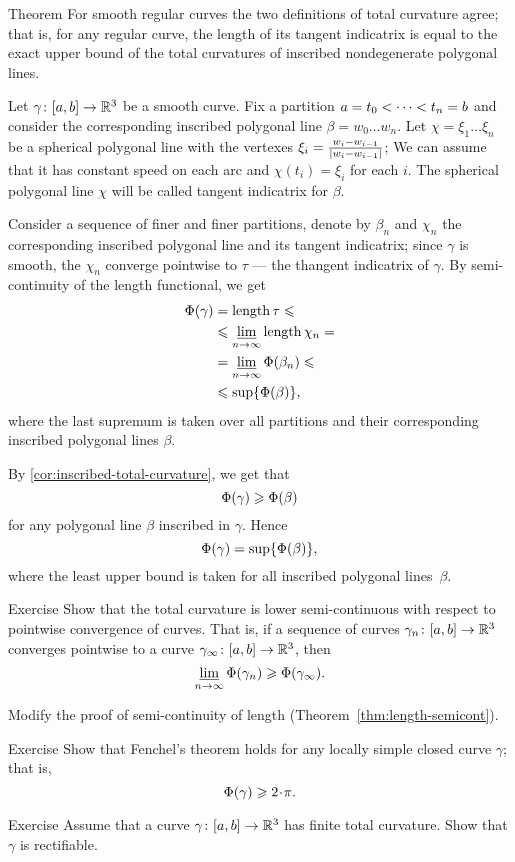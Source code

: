\begin{thm}{Theorem}\label{thm:total-curvature=}
For smooth regular curves the two definitions of total curvature agree;
that is, for any regular curve, the length of its tangent indicatrix is equal to the exact upper bound of the total curvatures of inscribed nondegenerate polygonal lines.
\end{thm}

Let $\gamma\colon[a,b]\to\mathbb{R}^3$ be a smooth curve.
Fix a partition $a\z=t_0<\dots<t_n=b$ and consider the corresponding inscribed polygonal line $\beta=w_0\dots w_n$.
Let $\chi=\xi_1\dots\xi_n$ be a spherical polygonal line
with the vertexes $\xi_i\z=\tfrac{w_i-w_{i-1}}{|w_i-w_{i-1}|}$;
We can assume that it has constant speed on each arc and $\chi(t_i)=\xi_i$ for each $i$. 
The spherical polygonal line $\chi$ will be called tangent indicatrix for $\beta$.

Consider a sequence of finer and finer partitions, denote by $\beta_n$ and $\chi_n$ the corresponding inscribed polygonal line and its tangent indicatrix;
since $\gamma$ is smooth, the $\chi_n$ converge pointwise to $\tau$ --- the thangent indicatrix of $\gamma$.
By semi-continuity of the length functional, we get  
\begin{align*}
\Phi({\gamma})&=\mathop{\rm length}\nolimits \tau\leqslant  
\\
&\leqslant \varliminf_{n\to\infty}\mathop{\rm length}\nolimits \chi_n=
\\
&= \varliminf_{n\to\infty}\Phi({\beta_n})\leqslant
\\
&\leqslant \sup\{\Phi({\beta})\},
\end{align*}
where the last supremum is taken over all partitions and their corresponding inscribed polygonal lines $\beta$.

By \ref{cor:inscribed-total-curvature}, we get that
\[\Phi({\gamma})\geqslant \Phi({\beta})\]
for any polygonal line $\beta$ inscribed in $\gamma$.
Hence 
\[\Phi({\gamma})=\sup\{\Phi({\beta})\},\]
where the least upper bound is taken for all inscribed polygonal lines~$\beta$.
\qeds


\begin{thm}{Exercise}
Show that the total curvature is lower semi-continuous with respect to pointwise convergence of curves.
That is, if a sequence
of curves $\gamma_n\colon[a,b]\to \mathbb{R}^3$ converges pointwise 
to a curve $\gamma_\infty\:[a,b]\z\to \RR^3$, then 
\[\varliminf_{n\to\infty} \Phi({\gamma_n}) \geqslant \Phi({\gamma_\infty}).\]
\end{thm}

 Modify the proof of semi-continuity of length (Theorem~\ref{thm:length-semicont}).

\begin{thm}{Exercise}
Show that Fenchel's theorem holds for any locally simple closed curve $\gamma$;
that is, 
\[\tc\gamma\ge2\cdot\pi.\]
\end{thm}

\begin{thm}{Exercise} 
Assume that a curve $\gamma\colon[a,b]\to\mathbb{R}^3$ has finite total curvature.
 Show that $\gamma$ is rectifiable.
\end{thm}
